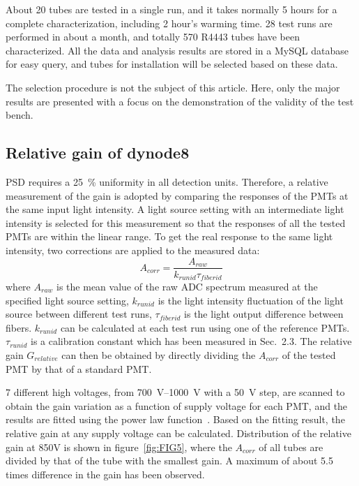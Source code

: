 \documentclass{JINST}
\begin{document}
About 20 tubes are tested in a single run, and it takes normally 5 hours for a complete characterization, including 2 hour's warming time. 
28 test runs are performed in about a month, and totally 570 R4443 tubes have been characterized. 
All the data and analysis results are stored in a MySQL database for easy query, and tubes for installation will be selected based on these data.
	
The selection procedure is not the subject of this article.
Here, only the major results are presented with a focus on the demonstration of the validity of the test bench. 
	
\subsection{Relative gain of dynode8}
\label{sec:psd_gain}
	
PSD requires a \SI{25}{\percent} uniformity in all detection units. 
Therefore, a relative measurement of the gain is adopted by comparing the responses of the PMTs at the same input light intensity.
A light source setting with an intermediate light intensity is selected for this measurement so that the responses of all the tested PMTs are within the linear range.    
To get the real response to the same light intensity, two corrections are applied to the measured data:
\begin{equation}
	A_{corr} = \frac{A_{raw}}{k_{runid}\tau_{fiberid}}
\end{equation} 
where $A_{raw}$ is the mean value of the raw ADC spectrum measured at the specified light source setting,
$k_{runid}$ is the light intensity fluctuation of the light source between different test runs,
$\tau_{fiberid}$ is the light output difference between fibers.
$k_{runid}$ can be calculated at each test run using one of the reference PMTs.
$\tau_{runid}$ is a calibration constant which has been measured in Sec.~2.3.
The relative gain $G_{relative}$ can then be obtained by directly dividing the $A_{corr}$ of the tested PMT by that of a standard PMT.   
	
7 different high voltages, from \SIrange{700}{1000}{\volt} with a \SI{50}{\volt} step, are scanned to obtain the gain variation as a function of supply voltage for each PMT, and the results are fitted using the power law function~\cite{hamamatsu}.
Based on the fitting result, the relative gain at any supply voltage can be calculated.
Distribution of the relative gain at 850V is shown in figure~\ref{fig:FIG5}, where the $A_{corr}$ of all tubes are divided by that of the tube with the smallest gain. 
A maximum of about 5.5 times difference in the gain has been observed.
	
\end{document}

